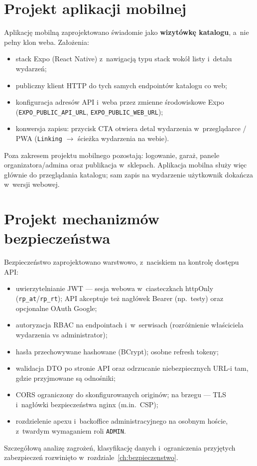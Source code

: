 \documentclass{sprz}
\begin{document}
\section{Projekt aplikacji mobilnej}
Aplikację mobilną zaprojektowano świadomie jako \textbf{wizytówkę katalogu}, a~nie pełny klon weba. Założenia:
\begin{itemize}
  \item stack Expo (React Native) z~nawigacją typu stack wokół listy i~detalu wydarzeń;
  \item publiczny klient HTTP do tych samych endpointów katalogu co web;
  \item konfiguracja adresów API i~weba przez zmienne środowiskowe Expo
        (\texttt{EXPO\_PUBLIC\_\allowbreak API\_URL}, \texttt{EXPO\_PUBLIC\_\allowbreak WEB\_URL});
  \item konwersja zapisu: przycisk CTA otwiera detal wydarzenia w~przeglądarce / PWA
        (\texttt{Linking} $\rightarrow$ ścieżka wydarzenia na webie).
\end{itemize}
Poza zakresem projektu mobilnego pozostają: logowanie, garaż, panele organizatora/admina oraz publikacja w~sklepach. Aplikacja mobilna służy więc głównie do przeglądania katalogu; sam zapis na wydarzenie użytkownik dokańcza w~wersji webowej.

\section{Projekt mechanizmów bezpieczeństwa}
Bezpieczeństwo zaprojektowano warstwowo, z~naciskiem na kontrolę dostępu API:
\begin{itemize}
  \item uwierzytelnianie JWT --- sesja webowa w~ciasteczkach httpOnly (\texttt{rp\_at}/\texttt{rp\_rt}); API akceptuje też nagłówek Bearer (np.\ testy) oraz opcjonalne OAuth Google;
  \item autoryzacja RBAC na endpointach i~w~serwisach (rozróżnienie właściciela wydarzenia vs administrator);
  \item hasła przechowywane hashowane (BCrypt); osobne refresh tokeny;
  \item walidacja DTO po stronie API oraz odrzucanie niebezpiecznych URL-i tam, gdzie przyjmowane są odnośniki;
  \item CORS ograniczony do skonfigurowanych originów; na brzegu --- TLS i~nagłówki bezpieczeństwa nginx (m.in.\ CSP);
  \item rozdzielenie apexu i~backoffice administracyjnego na osobnym hoście, z~twardym wymaganiem roli \texttt{ADMIN}.
\end{itemize}
Szczegółową analizę zagrożeń, klasyfikację danych i~ograniczenia przyjętych zabezpieczeń rozwinięto w~rozdziale~\ref{ch:bezpieczenstwo}.
\end{document}
